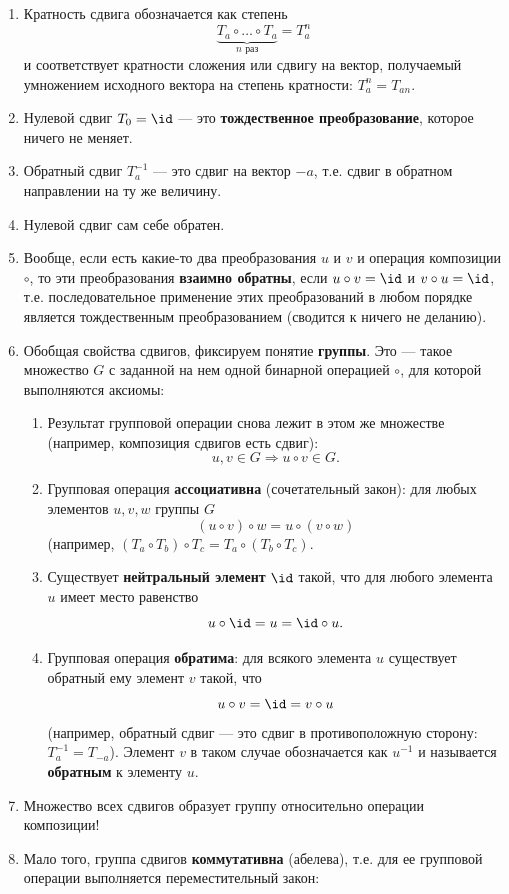 \begin{enumerate}
\item Кратность сдвига обозначается как степень
$$
\underbrace{T_a\circ\dots\circ T_a}_{n\mbox{ раз}}=T_a^n
$$
и соответствует кратности сложения или сдвигу на вектор, получаемый умножением исходного вектора на степень кратности: $T_a^n=T_{an}$.
\item Нулевой сдвиг $T_0=\id$ --- это \textbf{тождественное преобразование}, которое ничего не меняет.
\item Обратный сдвиг $T_a^{-1}$ --- это сдвиг на вектор $-a$, т.е. сдвиг в обратном направлении на ту же величину.
\item Нулевой сдвиг сам себе обратен.
\item Вообще, если есть какие-то два преобразования $u$ и $v$ и операция композиции $\circ$, то эти преобразования \textbf{взаимно обратны}, если $u\circ v=\id$ и $v\circ u=\id$, т.е. последовательное применение этих преобразований в любом порядке является тождественным преобразованием (сводится к ничего не деланию).
\item Обобщая свойства сдвигов, фиксируем понятие \textbf{группы}. Это --- такое множество $G$ с заданной на нем одной бинарной операцией $\circ$, для которой выполняются аксиомы:
\begin{enumerate}[{\bf G}1)]
\item Результат групповой операции снова лежит в этом же множестве (например, композиция сдвигов есть сдвиг):
$$
u,v\in G \Rightarrow u\circ v\in G.
$$
\item Групповая операция \textbf{ассоциативна} (сочетательный закон): для любых элементов $u,v,w$ группы $G$
$$
(u\circ v)\circ w = u\circ (v\circ w)
$$
(например, $(T_a\circ T_b)\circ T_c=T_a\circ(T_b\circ T_c)$.
\item Существует \textbf{нейтральный элемент} $\id$ такой, что для любого элемента $u$ имеет место равенство
$$
u\circ\id = u = \id\circ u.
$$
\item Групповая операция \textbf{обратима}: для всякого элемента $u$ существует обратный ему элемент $v$ такой, что
$$
u\circ v=\id = v\circ u
$$
(например, обратный сдвиг --- это сдвиг в противоположную сторону:  $T_{a}^{-1}=T_{-a}$). Элемент $v$ в таком случае обозначается как $u^{-1}$ и называется \textbf{обратным} к элементу $u$.
\end{enumerate}
\item Множество всех сдвигов образует группу относительно операции композиции!
\item Мало того, группа сдвигов \textbf{коммутативна} (абелева), т.е. для ее групповой операции выполняется переместительный закон:

\end{enumerate}
